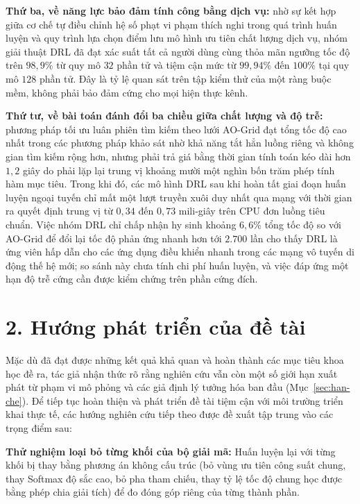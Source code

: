 \textbf{Thứ ba, về năng lực bảo đảm tính công bằng dịch vụ:} nhờ sự kết hợp giữa cơ chế tự điều chỉnh hệ số phạt vi
phạm thích nghi trong quá trình huấn luyện và quy trình lựa chọn điểm lưu mô hình ưu tiên chất lượng dịch vụ, nhóm
giải thuật DRL đã đạt xác suất tất cả người dùng cùng thỏa mãn ngưỡng tốc độ trên $98,9\%$ từ quy mô $32$ phần tử
và tiệm cận mức từ $99,94\%$ đến $100\%$ tại quy mô $128$ phần tử. Đây là tỷ lệ quan sát trên tập kiểm thử của một
ràng buộc mềm, không phải bảo đảm cứng cho mọi hiện thực kênh.

\textbf{Thứ tư, về bài toán đánh đổi ba chiều giữa chất lượng và độ trễ:} phương pháp tối ưu luân phiên tìm kiếm
theo lưới AO-Grid đạt tổng tốc độ cao nhất trong các phương pháp khảo sát nhờ khả năng tắt hẳn luồng riêng và không
gian tìm kiếm rộng hơn, nhưng phải trả giá bằng thời gian tính toán kéo dài hơn $1,2$ giây do phải lặp lại trung vị
khoảng mười một nghìn bốn trăm phép tính hàm mục tiêu. Trong khi đó, các mô hình DRL sau khi hoàn tất giai đoạn huấn
luyện ngoại tuyến chỉ mất một lượt truyền xuôi duy nhất qua mạng với thời gian ra quyết định trung vị từ $0,34$ đến
$0,73$ mili-giây trên CPU đơn luồng tiêu chuẩn. Việc nhóm DRL chỉ chấp nhận hy sinh khoảng $6,6\%$ tổng tốc độ so
với AO-Grid để đổi lại tốc độ phản ứng nhanh hơn tới $2.700$ lần cho thấy DRL là ứng viên hấp dẫn cho các ứng dụng
điều khiển nhanh trong các mạng vô tuyến di động thế hệ mới; so sánh này chưa tính chi phí huấn luyện, và việc đáp
ứng một hạn độ trễ cứng cần được kiểm chứng trên phần cứng đích.

\section*{2. Hướng phát triển của đề tài}

Mặc dù đã đạt được những kết quả khả quan và hoàn thành các mục tiêu khoa học đề ra, tác giả nhận thức rõ rằng
nghiên cứu vẫn còn một số giới hạn xuất phát từ phạm vi mô phỏng và các giả định lý tưởng hóa ban đầu
(Mục~\ref{sec:han-che}). Để tiếp tục hoàn thiện và phát triển đề tài tiệm cận với môi trường triển khai thực tế, các
hướng nghiên cứu tiếp theo được đề xuất tập trung vào các trọng điểm sau:

\textbf{Thử nghiệm loại bỏ từng khối của bộ giải mã:} Huấn luyện lại với từng khối bị thay bằng phương án không cấu
trúc (bỏ vùng ưu tiên công suất chung, thay Softmax độ sắc cao, bỏ pha tham chiếu, thay tỷ lệ tốc độ chung học được
bằng phép chia giải tích) để đo đóng góp riêng của từng thành phần.

